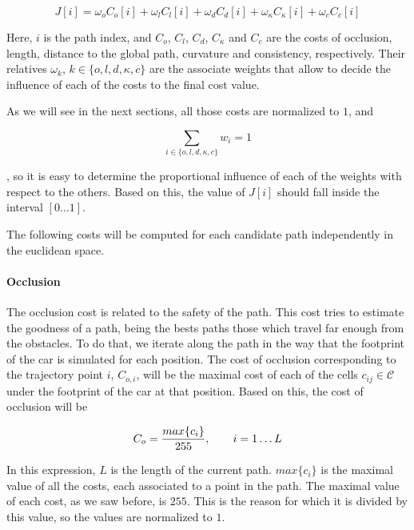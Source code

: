 \begin{equation}\label{eq:cp07_cost_function}
J[i] = \omega_o C_o[i] + \omega_l C_l[i] + \omega_d C_d[i] + \omega_{\kappa} C_{\kappa}[i] + \omega_c C_c[i]
\end{equation}

Here, $i$ is the path index, and $C_o$, $C_l$, $C_d$, $C_{\kappa}$ and $C_c$ are the costs of occlusion, length, distance to the global path, curvature and consistency, respectively. Their relatives $\omega_k$, $k \in \{o, l, d, \kappa, c\}$ are the associate weights that allow to decide the influence of each of the costs to the final cost value.

As we will see in the next sections, all those costs are normalized to $1$, and 

\begin{equation}\label{eq:cp07_weights_sum}
\sum_{{i \in \{o, l, d, \kappa, c\}}} w_i= 1
\end{equation}

, so it is easy to determine the proportional influence of each of the weights with respect to the others. Based on this, the value of $J[i]$ should fall inside the interval $[0\dots1]$.

The following costs will be computed for each candidate path independently in the euclidean space.

\paragraph{Occlusion}\label{ch:chapter07_01_04_00_01}

The occlusion cost is related to the safety of the path. This cost tries to estimate the goodness of a path, being the bests paths those which travel far enough from the obstacles. To do that, we iterate along the path in the way that the footprint of the car is simulated for each position. The cost of occlusion corresponding to the trajectory point $i$, $C_{o,i}$, will be the maximal cost of each of the cells $c_{ij} \in \mathcal{C}$ under the footprint of the car at that position. Based on this, the cost of occlusion will be

\begin{equation}\label{eq:cp07_occlusion_cost}
C_o = {{max\{c_i\}} \over 255}, ~~~~~~ i=1 \dots L
\end{equation}

In this expression, $L$ is the length of the current path. $max\{c_i\}$ is the maximal value of all the costs, each associated to a point in the path. The maximal value of each cost, as we saw before, is $255$. This is the reason for which it is divided by this value, so the values are normalized to $1$.

